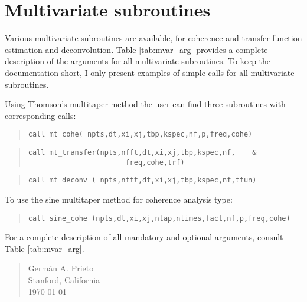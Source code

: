 \documentclass{article}
\begin{document}
\section{Multivariate subroutines}
Various multivariate subroutines are available, for coherence and transfer function estimation and deconvolution. Table \ref{tab:mvar_arg} provides a complete description of the arguments for all multivariate subroutines. To keep the documentation short, I only present examples of simple calls for all multivariate subroutines.

Using Thomson's multitaper method the user can find three subroutines with corresponding calls:
\begin{quote}
\begin{verbatim}
call mt_cohe( npts,dt,xi,xj,tbp,kspec,nf,p,freq,cohe)  
\end{verbatim}
\end{quote}

\begin{quote}
\begin{verbatim}
call mt_transfer(npts,nfft,dt,xi,xj,tbp,kspec,nf,    &
                       freq,cohe,trf)
\end{verbatim}
\end{quote}

\begin{quote}
\begin{verbatim}
call mt_deconv ( npts,nfft,dt,xi,xj,tbp,kspec,nf,tfun)     
\end{verbatim}
\end{quote}           
To use the sine multitaper method for coherence analysis type:
\begin{quote}
\begin{verbatim}
call sine_cohe (npts,dt,xi,xj,ntap,ntimes,fact,nf,p,freq,cohe) 
\end{verbatim}
\end{quote}
For a complete description of all mandatory and optional arguments, consult Table \ref{tab:mvar_arg}.

\vspace{0.5cm}

\begin{quote}
Germ\'an A. Prieto \\
Stanford, California \\
\today
\end{quote}
\end{document}

